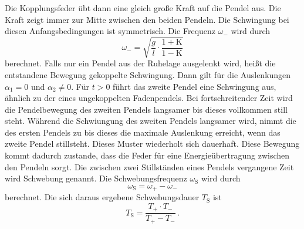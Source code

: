 Die Kopplungsfeder übt dann eine gleich große Kraft auf die Pendel aus. Die Kraft zeigt immer zur Mitte zwischen den beiden Pendeln. 
Die Schwingung bei diesen Anfangsbedingungen ist symmetrisch.
Die Frequenz $\omega_-$ wird durch
\begin{equation}
    \omega_- = \sqrt{\frac{g}{l} \cdot \frac{1 + \text{K}}{1 - \text{K}}}
    \label{eqn:OmegaGegensinnig}
\end{equation}
berechnet. 
Falls nur ein Pendel aus der Ruhelage ausgelenkt wird, heißt die entstandene Bewegung gekoppelte Schwingung. Dann gilt für 
die Auslenkungen $\alpha_1 = 0$ und $\alpha_2 \neq 0$. 
Für $t > 0$ führt das zweite Pendel eine Schwingung aus, ähnlich zu der eines ungekoppelten Fadenpendels. Bei fortschreitender Zeit wird die Pendelbewegung des 
zweiten Pendels langsamer bis dieses vollkommen still steht. Während die Schwiungung des zweiten Pendels langsamer wird, nimmt die des ersten Pendels zu bis dieses die 
maximale Auslenkung erreicht, wenn das zweite Pendel stillsteht. Dieses Muster wiederholt sich dauerhaft. Diese Bewegung kommt dadurch zustande, dass 
die Feder für eine Energieübertragung zwischen den Pendeln sorgt. Die zwischen zwei Stillständen eines Pendels vergangene Zeit wird Schwebung genannt.
Die Schwebungsfrequenz $\omega_{\text{S}}$ wird durch 
\begin{equation}
    \omega_{\text{S}} =  \omega_+ - \omega_-
    \label{eqn:OmegaSchwebung}
\end{equation}
berechnet. Die sich daraus ergebene Schwebungsdauer $T_{\text{S}}$ ist
\begin{equation}
    T_{\text{S}} =  \frac{T_+ \cdot T_-}{T_+ - T_-}\,.
    \label{eqn:TSchwebung}
\end{equation}
 
